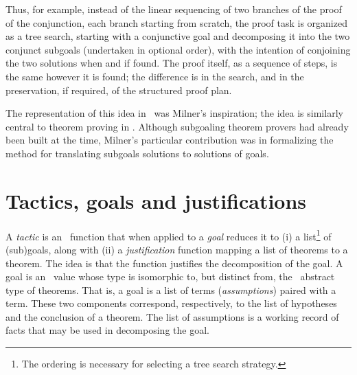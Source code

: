 Thus, for example, instead of
the linear sequencing of two branches of the proof of the conjunction,
each branch starting from scratch, the proof task is organized
as a tree search, starting with a conjunctive goal
and decomposing it into the two conjunct subgoals (undertaken in optional
order), with the intention of conjoining the two solutions when and if found.
The proof itself, as a sequence of steps, is the same however it is found;
the difference is in the search, and in the preservation, if required, of
the structured proof plan.

The representation of this idea in \LCF\ was Milner's inspiration;
the idea is similarly central to theorem proving in \HOL.
Although subgoaling theorem provers had already been built at the time,
Milner's particular contribution was in formalizing the method for
translating subgoals solutions to solutions of goals.




\section{Tactics, goals and justifications}
\label{tactics}

A {\it tactic\/} is an \ML\ function that when applied to a {\it goal\/} 
reduces it to (i) a list\footnote{The ordering is necessary for selecting
a tree search strategy.} of 
(sub)goals, along with (ii) a {\it justification\/}
 function mapping
a list of theorems to a theorem.
The idea is that the function justifies the decomposition of the goal.
A goal is an \ML\ value whose type is isomorphic
to, but distinct from, the \ML\ abstract type  of theorems.
That is, a goal is
a list of terms ({\it assumptions\/})
 paired with a term.
These two components correspond, respectively, to the list of hypotheses
and the conclusion of a theorem. The list of assumptions is a working
record of facts that may be used in decomposing the goal.

